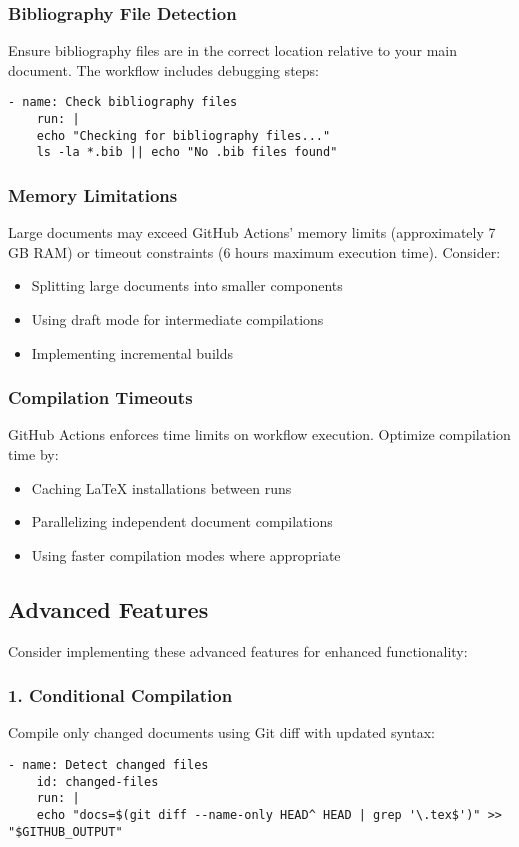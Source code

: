 \subsubsection{Bibliography File Detection}
Ensure bibliography files are in the correct location relative to your main document. The workflow includes debugging steps:
\begin{lstlisting}[breaklines=true]
	- name: Check bibliography files
	run: |
	echo "Checking for bibliography files..."
	ls -la *.bib || echo "No .bib files found"
\end{lstlisting}

\subsubsection{Memory Limitations}
Large documents may exceed GitHub Actions' memory limits (approximately 7 GB RAM) or timeout constraints (6 hours maximum execution time). Consider:
\begin{itemize}
	\item Splitting large documents into smaller components
	\item Using draft mode for intermediate compilations
	\item Implementing incremental builds
\end{itemize}

\subsubsection{Compilation Timeouts}
GitHub Actions enforces time limits on workflow execution. Optimize compilation time by:
\begin{itemize}
	\item Caching LaTeX installations between runs
	\item Parallelizing independent document compilations
	\item Using faster compilation modes where appropriate
\end{itemize}

\subsection{Advanced Features}

Consider implementing these advanced features for enhanced functionality:

\subsubsection{1. Conditional Compilation}
Compile only changed documents using Git diff with updated syntax:
\begin{lstlisting}[breaklines=true]
	- name: Detect changed files
	id: changed-files
	run: |
	echo "docs=$(git diff --name-only HEAD^ HEAD | grep '\.tex$')" >> "$GITHUB_OUTPUT"
\end{lstlisting}

